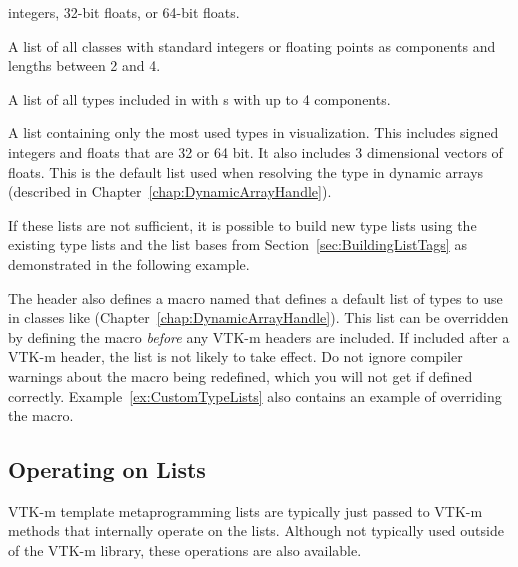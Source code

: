 \begin{description}
  integers, 32-bit floats, or 64-bit floats.
\item[\vtkm{TypeListTagVecAll}] A list of all  classes with
  standard integers or floating points as components and lengths between 2
  and 4.
\item[\vtkm{TypeListTagAll}] A list of all types included in
   with s with up to 4 components.
\item[\vtkm{TypeListTagCommon}] A list containing only the most used types
  in visualization. This includes signed integers and floats that are 32 or
  64 bit. It also includes 3 dimensional vectors of floats. This is the
  default list used when resolving the type in dynamic arrays (described in
  Chapter~\ref{chap:DynamicArrayHandle}).
\end{description}

If these lists are not sufficient, it is possible to build new type lists
using the existing type lists and the list bases from
Section~\ref{sec:BuildingListTags} as demonstrated in the following
example.


The  header also defines a macro named
 that defines a default list of
types to use in classes like 
(Chapter~\ref{chap:DynamicArrayHandle}). This list can be overridden by
defining the  macro \emph{before}
any VTK-m headers are included. If included after a VTK-m header, the list
is not likely to take effect. Do not ignore compiler warnings about the
macro being redefined, which you will not get if defined
correctly. Example~\ref{ex:CustomTypeLists} also contains an example of
overriding the  macro.


\subsection{Operating on Lists}
\label{sec:OperatingOnLists}

VTK-m template metaprogramming lists are typically just passed to VTK-m
methods that internally operate on the lists. Although not typically used
outside of the VTK-m library, these operations are also available.

